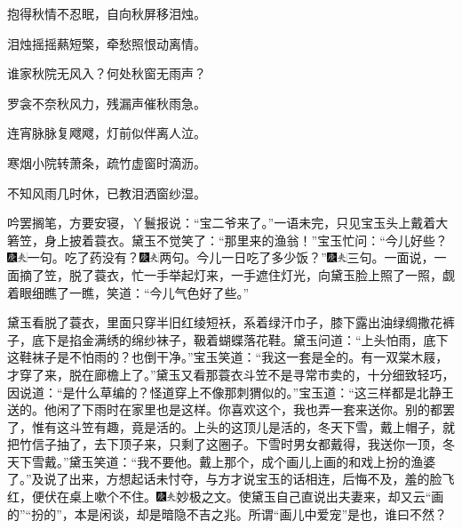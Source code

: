 抱得秋情不忍眠，自向秋屏移泪烛。

泪烛摇摇爇短檠，牵愁照恨动离情。

谁家秋院无风入？何处秋窗无雨声？

罗衾不奈秋风力，残漏声催秋雨急。

连宵脉脉复飕飕，灯前似伴离人泣。

寒烟小院转萧条，疏竹虚窗时滴沥。

不知风雨几时休，已教泪洒窗纱湿。

吟罢搁笔，方要安寝，丫鬟报说：``宝二爷来了。''一语未完，只见宝玉头上戴着大箬笠，身上披着蓑衣。黛玉不觉笑了：``那里来的渔翁！''宝玉忙问：``今儿好些？{\includegraphics[width=3mm]{../Images/00004}\includegraphics[width=3mm]{../Images/00012}\footnotesize \kaishu 一句。}吃了药没有？{\includegraphics[width=3mm]{../Images/00004}\includegraphics[width=3mm]{../Images/00012}\footnotesize \kaishu 两句。}今儿一日吃了多少饭？''{\includegraphics[width=3mm]{../Images/00004}\includegraphics[width=3mm]{../Images/00012}\footnotesize \kaishu 三句。}一面说，一面摘了笠，脱了蓑衣，忙一手举起灯来，一手遮住灯光，向黛玉脸上照了一照，觑着眼细瞧了一瞧，笑道：``今儿气色好了些。''

黛玉看脱了蓑衣，里面只穿半旧红绫短袄，系着绿汗巾子，膝下露出油绿绸撒花裤子，底下是掐金满绣的绵纱袜子，靸着蝴蝶落花鞋。黛玉问道：``上头怕雨，底下这鞋袜子是不怕雨的？也倒干净。''宝玉笑道：``我这一套是全的。有一双棠木屐，才穿了来，脱在廊檐上了。''黛玉又看那蓑衣斗笠不是寻常市卖的，十分细致轻巧，因说道：``是什么草编的？怪道穿上不像那刺猬似的。''宝玉道：``这三样都是北静王送的。他闲了下雨时在家里也是这样。你喜欢这个，我也弄一套来送你。别的都罢了，惟有这斗笠有趣，竟是活的。上头的这顶儿是活的，冬天下雪，戴上帽子，就把竹信子抽了，去下顶子来，只剩了这圈子。下雪时男女都戴得，我送你一顶，冬天下雪戴。''黛玉笑道：``我不要他。戴上那个，成个画儿上画的和戏上扮的渔婆了。''及说了出来，方想起话未忖夺，与方才说宝玉的话相连，后悔不及，羞的脸飞红，便伏在桌上嗽个不住。{\includegraphics[width=3mm]{../Images/00004}\includegraphics[width=3mm]{../Images/00012}\footnotesize \kaishu 妙极之文。使黛玉自己直说出夫妻来，却又云``画的''``扮的''，本是闲谈，却是暗隐不吉之兆。所谓``画儿中爱宠''是也，谁曰不然？}

